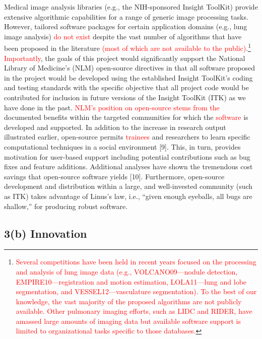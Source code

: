 \documentclass[11pt,]{article}
\let\rmarkdownfootnote\footnote%
\def\footnote{\protect\rmarkdownfootnote}
\begin{document}
Medical image analysis libraries (e.g., the NIH-sponsored Insight
ToolKit) provide extensive algorithmic capabilities for a range of
generic image processing tasks. However, tailored software packages for
certain application domains (e.g., lung image analysis)
\textcolor{red}{do not exist} despite the vast number of algorithms that
have been proposed in the literature
\textcolor{red}{(most of which are not available to the public)}.\footnote{\textcolor{red}{Several competitions have been held in recent years focused on the processing and
  analysis of lung image data (e.g., VOLCANO09---nodule detection, EMPIRE10---registration and motion estimation,
  LOLA11---lung and lobe segmentation, and VESSEL12---vasculature segmentation).  To the best of our knowledge, the vast majority of
  the proposed algorithms are not publicly available.  Other pulmonary imaging efforts, such as LIDC
  and RIDER, have amassed large amounts of imaging data but available software support is limited to organizational
  tasks specific to those databases.}} \textcolor{red}{Importantly}, the
goals of this project would significantly support the National Library
of Medicine's (NLM) open-source directives in that all software proposed
in the project would be developed using the established Insight
ToolKit's coding and testing standards with the specific objective that
all project code would be contributed for inclusion in future versions
of the Insight ToolKit (ITK) as we have done in the past.
\textcolor{red}{NLM's position on open-source stems from the} documented
benefits within the targeted communities for which the
\textcolor{red}{software} is developed and supported. In addition to the
increase in research output illustrated earlier, open-source permits
\textcolor{red}{trainees} and researchers to learn specific
computational techniques in a social environment {[}9{]}. This, in turn,
provides motivation for user-based support including potential
contributions such as bug fixes and feature additions. Additional
analyses have shown the tremendous cost savings that open-source
software yields {[}10{]}. Furthermore, open-source development and
distribution within a large, and well-invested community (such as ITK)
takes advantage of Linus's law, i.e., ``given enough eyeballs, all bugs
are shallow,'' for producing robust software.

\subsection{\texorpdfstring{\textbf{3(b)
Innovation}}{3(b) Innovation}}\label{b-innovation}
\end{document}

